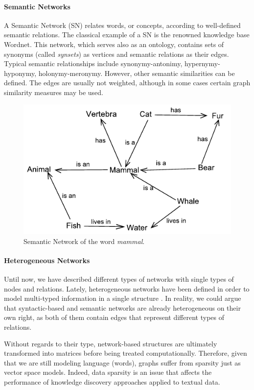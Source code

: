 \paragraph{Semantic Networks}
A Semantic Network (SN) relates words, or concepts, according to well-defined semantic relations. The classical example of a SN is the renowned knowledge base Wordnet. This network, which serves also as an ontology, contains sets of synonyms (called \textit{synsets}) as vertices and semantic relations as their edges. Typical semantic relationships include synonymy-antonimy, hypernymy-hyponymy, holonymy-meronymy. However, other semantic similarities can be defined. The edges are usually not weighted, although in some cases certain graph similarity measures may be used.

\begin{figure}[!h]
\centering
\includegraphics[width=0.7\linewidth]{images/Chapitre2/sem_net.pdf}
\caption{Semantic Network of the word \textit{mammal}.}
\label{fig:sem_net}
\end{figure}


\paragraph{Heterogeneous Networks}
Until now, we have described different types of networks with single types of nodes and relations. Lately, heterogeneous networks have been defined in order to model multi-typed information in a single structure \cite{Jiawei2009}. In reality, we could argue that syntactic-based and semantic networks are already heterogeneous on their own right, as both of them contain edges that represent different types of relations.



Without regards to their type, network-based structures are ultimately transformed into matrices before being treated computationally. Therefore, given that we are still modeling language (words), graphs suffer from sparsity just as vector space models. Indeed, data sparsity is an issue that affects the performance of knowledge discovery approaches \cite{mining12Book,PerinetH15} applied to textual data.

